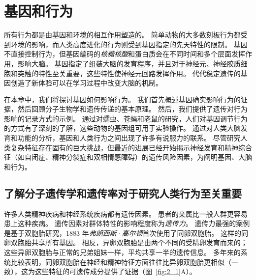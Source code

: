 \chapter{基因和行为} \label{chap:chap2}

所有行为都是由基因和环境的相互作用塑造的。
简单动物的大多数刻板行为都受到环境的影响，而人类高度进化的行为则受到基因指定的先天特性的限制。
基因不直接控制行为，但基因编码的\textit{核糖核酸}和蛋白质会在不同时间和多个层面发挥作用，影响大脑。
基因指定了组装大脑的发育程序，并且对于神经元、神经胶质细胞和突触的特性至关重要，这些特性使神经元回路发挥作用。
代代稳定遗传的基因创造了新体验可以在学习过程中改变大脑的机制。


在本章中，我们将探讨基因如何影响行为。
我们首先概述基因确实影响行为的证据，然后回顾分子生物学和遗传传递的基本原理。
然后，我们提供了遗传对行为影响的记录方式的示例。
通过对蠕虫、苍蝇和老鼠的研究，人们对基因调节行为的方式有了深刻的了解，这些动物的基因组可用于实验操作。
通过对人类大脑发育和功能的分析，基因和人类行为之间出现了许多有说服力的联系。
尽管研究人类复杂特征存在固有的巨大挑战，但最近的进展已经开始揭示神经发育和精神综合征（如自闭症、精神分裂症和双相情感障碍）的遗传风险因素，为阐明基因、大脑和行为。



\section{了解分子遗传学和遗传率对于研究人类行为至关重要}

许多人类精神疾病和神经系统疾病都有遗传因素。
患者的亲属比一般人群更容易患上这种疾病。
遗传因素对群体特性的影响程度称为\textit{遗传力}。
遗传力最强的案例是基于双胞胎研究，1883 年\textit{弗朗西斯·高尔顿}首次使用了同卵双胞胎。
这样的同卵双胞胎共享所有基因。
相反，异卵双胞胎是由两个不同的受精卵发育而来的；
这些异卵双胞胎与正常的兄弟姐妹一样，平均共享一半的遗传信息。
多年来的系统比较表明，同卵双胞胎在神经和精神特征方面往往比异卵双胞胎更相似（一致），这为这些特征的可遗传成分提供了证据（图~\ref{fig:2_1}A）。


